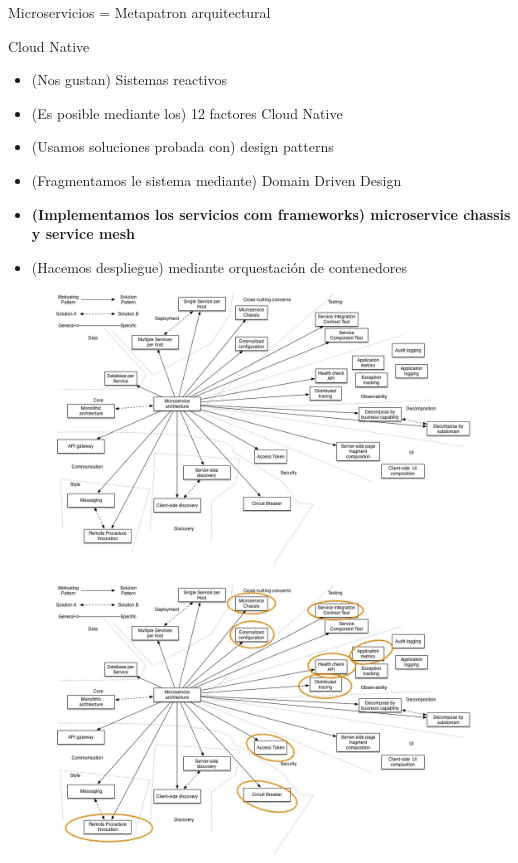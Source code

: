 \documentclass[aspectratio=169]{beamer}
\begin{document}
\begin{frame}{Microservicios = Metapatron arquitectural}
	
	Cloud Native
	\begin{itemize}
		\item (Nos gustan) Sistemas reactivos
		\item (Es posible mediante los) 12 factores Cloud Native
		\item (Usamos soluciones probada con) design patterns
		\item (Fragmentamos le sistema mediante) Domain Driven Design
		\item \textbf{(Implementamos los servicios com frameworks) microservice chassis y service mesh}
		\item (Hacemos despliegue) mediante orquestación de contenedores
	\end{itemize}
	
\end{frame}

\begin{frame}{}
\begin{figure}
	\centering
	\includegraphics[width=\linewidth]{Images/PatternsRelatedToMicroservices}
\end{figure}
\end{frame}

\begin{frame}{}
\begin{figure}
	\centering
	\includegraphics[width=\linewidth]{Images/PatternsRelatedToMicroservices2}
\end{figure}
\end{frame}
\end{document}
